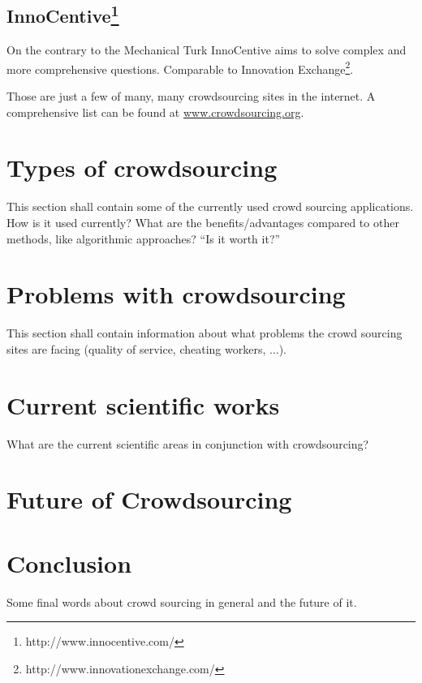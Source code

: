 \documentclass{acm_proc_article-sp}
\begin{document}
\subsection*{InnoCentive\footnote{http://www.innocentive.com/}}
On the contrary to the Mechanical Turk InnoCentive aims to solve complex and more comprehensive questions. Comparable to Innovation Exchange\footnote{http://www.innovationexchange.com/}.

Those are just a few of many, many crowdsourcing sites in the internet. A comprehensive list can be found at \href{http://www.crowdsourcing.org/directory}{www.crowdsourcing.org}.

\section{Types of crowdsourcing}
\label{sect:types}
This section shall contain some of the currently used crowd sourcing applications. How is it used currently? What are the benefits/advantages compared to other methods, like algorithmic approaches? ``Is it worth it?''

\section{Problems with crowdsourcing}
\label{sect:problems}
This section shall contain information about what problems the crowd sourcing sites are facing (quality of service, cheating workers, ...).

\section {Current scientific works}
\label{sect:current}
What are the current scientific areas in conjunction with crowdsourcing? 

\section{Future of Crowdsourcing}
\label{sect:future}

\section{Conclusion}
\label{sect:conclusion}

Some final words about crowd sourcing in general and the future of it.


\end{document}
